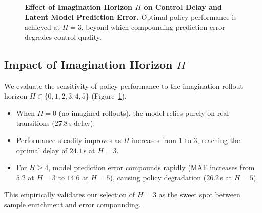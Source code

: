 \documentclass[11pt,a4paper,twocolumn]{article}
\begin{document}
\begin{figure}[t]
\centering
{}
\caption{\textbf{Effect of Imagination Horizon $H$ on Control Delay and Latent Model Prediction Error.} Optimal policy performance is achieved at $H=3$, beyond which compounding prediction error degrades control quality.}
\label{fig:horizon_curve}
\end{figure}

\subsection{Impact of Imagination Horizon $H$}
We evaluate the sensitivity of policy performance to the imagination rollout horizon $H \in \{0, 1, 2, 3, 4, 5\}$ (Figure~\ref{fig:horizon_curve}).
\begin{itemize}
    \item When $H=0$ (no imagined rollouts), the model relies purely on real transitions ($27.8$\,s delay).
    \item Performance steadily improves as $H$ increases from $1$ to $3$, reaching the optimal delay of $24.1$\,s at $H=3$.
    \item For $H \geq 4$, model prediction error compounds rapidly (MAE increases from $5.2$ at $H=3$ to $14.6$ at $H=5$), causing policy degradation ($26.2$\,s at $H=5$).
\end{itemize}
This empirically validates our selection of $H=3$ as the sweet spot between sample enrichment and error compounding.
\end{document}
